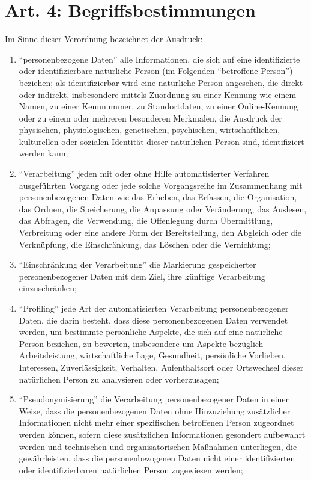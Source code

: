     \section{Art. 4: Begriffsbestimmungen}
    Im Sinne dieser Verordnung bezeichnet der Ausdruck:
        \begin{enumerate}[label=\arabic*.]
            \item ``personenbezogene Daten'' alle Informationen, die sich auf eine identifizierte oder identifizierbare natürliche Person (im Folgenden ``betroffene Person'') beziehen; als identifizierbar wird eine natürliche Person angesehen, die direkt oder indirekt, insbesondere mittels Zuordnung zu einer Kennung wie einem Namen, zu einer Kennnummer, zu Standortdaten, zu einer Online-Kennung oder zu einem oder mehreren besonderen Merkmalen, die Ausdruck der physischen, physiologischen, genetischen, psychischen, wirtschaftlichen, kulturellen oder sozialen Identität dieser natürlichen Person sind, identifiziert werden kann; 
            \item ``Verarbeitung'' jeden mit oder ohne Hilfe automatisierter Verfahren ausgeführten Vorgang oder jede solche Vorgangsreihe im Zusammenhang mit personenbezogenen Daten wie das Erheben, das Erfassen, die Organisation, das Ordnen, die Speicherung, die Anpassung oder Veränderung, das Auslesen, das Abfragen, die Verwendung, die Offenlegung durch Übermittlung, Verbreitung oder eine andere Form der Bereitstellung, den Abgleich oder die Verknüpfung, die Einschränkung, das Löschen oder die Vernichtung;
            \item ``Einschränkung der Verarbeitung'' die Markierung gespeicherter personenbezogener Daten mit dem Ziel, ihre künftige Verarbeitung einzuschränken;
            \item ``Profiling'' jede Art der automatisierten Verarbeitung personenbezogener Daten, die darin besteht, dass diese personenbezogenen Daten verwendet werden, um bestimmte persönliche Aspekte, die sich auf eine natürliche Person beziehen, zu bewerten, insbesondere um Aspekte bezüglich Arbeitsleistung, wirtschaftliche Lage, Gesundheit, persönliche Vorlieben, Interessen, Zuverlässigkeit, Verhalten, Aufenthaltsort oder Ortswechsel dieser natürlichen Person zu analysieren oder vorherzusagen;
            \item ``Pseudonymisierung'' die Verarbeitung personenbezogener Daten in einer Weise, dass die personenbezogenen Daten ohne Hinzuziehung zusätzlicher Informationen nicht mehr einer spezifischen betroffenen Person zugeordnet werden können, sofern diese zusätzlichen Informationen gesondert aufbewahrt werden und technischen und organisatorischen Maßnahmen unterliegen, die gewährleisten, dass die personenbezogenen Daten nicht einer identifizierten oder identifizierbaren natürlichen Person zugewiesen werden; 

\end{enumerate}
